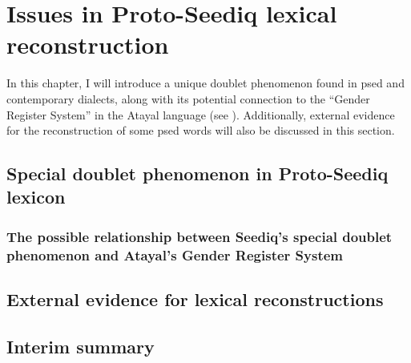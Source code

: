 \chapter{Issues in Proto-Seediq lexical reconstruction} \label{ch6}

In this chapter, I will introduce a unique doublet phenomenon found in \acl{psed} and contemporary dialects, along with its potential connection to the ``Gender Register System'' in the Atayal language (see \cite{li1980gender,li1982gender,li1983gender,goderich2020phd}). Additionally, external evidence for the reconstruction of some \acl{psed} words will also be discussed in this section.


\section{Special doublet phenomenon in Proto-Seediq lexicon} \label{sec:sepical_doublet}
\lipsum[1-15]

\subsection{The possible relationship between Seediq's special doublet phenomenon and Atayal's Gender Register System}
\lipsum[1-7]

\section{External evidence for lexical reconstructions} \label{sec:external_lexical_evidence}
\lipsum[1-7]

\section{Interim summary}
\lipsum[1-4]